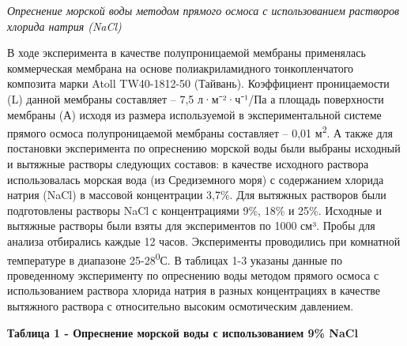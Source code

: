 \emph{Опреснение морской воды методом прямого осмоса с использованием
растворов хлорида натрия (NaCl)}

В ходе эксперимента в качестве полупроницаемой мембраны применялась
коммерческая мембрана на основе полиакриламидного тонкопленчатого
композита марки Atoll TW40-1812-50 (Тайвань). Коэффициент проницаемости
(L) данной мембраны составляет -- 7,5 л·м⁻²·ч⁻¹/Па а площадь поверхности
мембраны (А) исходя из размера используемой в экспериментальной системе
прямого осмоса полупроницаемой мембраны составляет -- 0,01
м\textsuperscript{2}. А также для постановки эксперимента по опреснению
морской воды были выбраны исходный и вытяжные растворы следующих
составов: в качестве исходного раствора использовалась морская вода (из
Средиземного моря) с содержанием хлорида натрия (NaCl) в массовой
концентрации 3,7\%. Для вытяжных растворов были подготовлены растворы
NaCl с концентрациями 9\%, 18\% и 25\%. Исходные и вытяжные растворы
были взяты для экспериментов по 1000 см³. Пробы для анализа отбирались
каждые 12 часов. Эксперименты проводились при комнатной температуре в
диапазоне 25-28\textsuperscript{0}С. В таблицах 1-3 указаны данные по
проведенному эксперименту по опреснению воды методом прямого осмоса с
использованием раствора хлорида натрия в разных концентрациях в качестве
вытяжного раствора с относительно высоким осмотическим давлением.

{\bfseries Таблица 1 - Опреснение морской воды с использованием 9\% NaCl}

